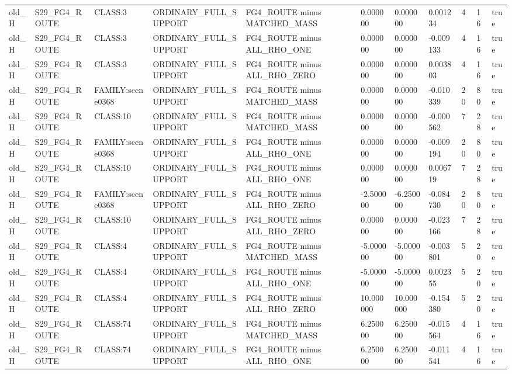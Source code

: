 \begin{tabular}{lllllllllll}
old\_H & S29\_FG4\_ROUTE & CLASS:3 & ORDINARY\_FULL\_SUPPORT & FG4\_ROUTE minus MATCHED\_MASS & 0.000000 & 0.000000 & 0.001234 & 4 & 16 & true \\
old\_H & S29\_FG4\_ROUTE & CLASS:3 & ORDINARY\_FULL\_SUPPORT & FG4\_ROUTE minus ALL\_RHO\_ONE & 0.000000 & 0.000000 & -0.009133 & 4 & 16 & true \\
old\_H & S29\_FG4\_ROUTE & CLASS:3 & ORDINARY\_FULL\_SUPPORT & FG4\_ROUTE minus ALL\_RHO\_ZERO & 0.000000 & 0.000000 & 0.003803 & 4 & 16 & true \\
old\_H & S29\_FG4\_ROUTE & FAMILY:scene0368 & ORDINARY\_FULL\_SUPPORT & FG4\_ROUTE minus MATCHED\_MASS & 0.000000 & 0.000000 & -0.010339 & 20 & 80 & true \\
old\_H & S29\_FG4\_ROUTE & CLASS:10 & ORDINARY\_FULL\_SUPPORT & FG4\_ROUTE minus MATCHED\_MASS & 0.000000 & 0.000000 & -0.000562 & 7 & 28 & true \\
old\_H & S29\_FG4\_ROUTE & FAMILY:scene0368 & ORDINARY\_FULL\_SUPPORT & FG4\_ROUTE minus ALL\_RHO\_ONE & 0.000000 & 0.000000 & -0.009194 & 20 & 80 & true \\
old\_H & S29\_FG4\_ROUTE & CLASS:10 & ORDINARY\_FULL\_SUPPORT & FG4\_ROUTE minus ALL\_RHO\_ONE & 0.000000 & 0.000000 & 0.006719 & 7 & 28 & true \\
old\_H & S29\_FG4\_ROUTE & FAMILY:scene0368 & ORDINARY\_FULL\_SUPPORT & FG4\_ROUTE minus ALL\_RHO\_ZERO & -2.500000 & -6.250000 & -0.084730 & 20 & 80 & true \\
old\_H & S29\_FG4\_ROUTE & CLASS:10 & ORDINARY\_FULL\_SUPPORT & FG4\_ROUTE minus ALL\_RHO\_ZERO & 0.000000 & 0.000000 & -0.023166 & 7 & 28 & true \\
old\_H & S29\_FG4\_ROUTE & CLASS:4 & ORDINARY\_FULL\_SUPPORT & FG4\_ROUTE minus MATCHED\_MASS & -5.000000 & -5.000000 & -0.003801 & 5 & 20 & true \\
old\_H & S29\_FG4\_ROUTE & CLASS:4 & ORDINARY\_FULL\_SUPPORT & FG4\_ROUTE minus ALL\_RHO\_ONE & -5.000000 & -5.000000 & 0.002355 & 5 & 20 & true \\
old\_H & S29\_FG4\_ROUTE & CLASS:4 & ORDINARY\_FULL\_SUPPORT & FG4\_ROUTE minus ALL\_RHO\_ZERO & 10.000000 & 10.000000 & -0.154380 & 5 & 20 & true \\
old\_H & S29\_FG4\_ROUTE & CLASS:74 & ORDINARY\_FULL\_SUPPORT & FG4\_ROUTE minus MATCHED\_MASS & 6.250000 & 6.250000 & -0.015564 & 4 & 16 & true \\
old\_H & S29\_FG4\_ROUTE & CLASS:74 & ORDINARY\_FULL\_SUPPORT & FG4\_ROUTE minus ALL\_RHO\_ONE & 6.250000 & 6.250000 & -0.011541 & 4 & 16 & true \\

\end{tabular}
